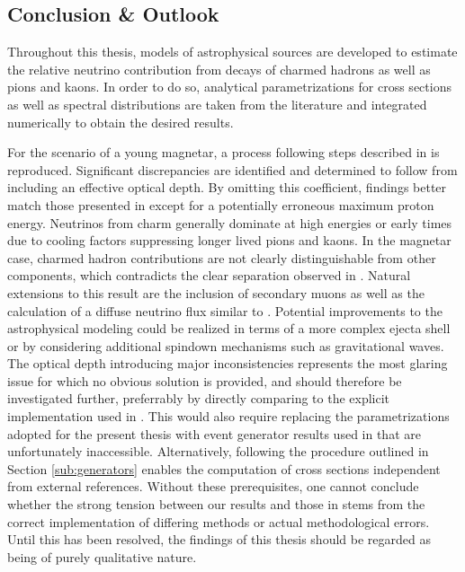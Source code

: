 \begin{spacing}{0.990}
	\chapter{Conclusion \& Outlook}
	\label{ch:conclusion}
	
	Throughout this thesis, models of astrophysical sources are developed to estimate the relative neutrino contribution from
	decays of charmed hadrons as well as pions and kaons. In order to do so, analytical parametrizations for cross sections as well as
	spectral distributions are taken from the literature and integrated numerically to obtain the desired results.
	
	For the scenario of a young magnetar, a process following steps described in \cite{Carpio_2020} is reproduced. Significant
	discrepancies are identified and determined to follow from including an effective optical depth. By omitting this coefficient,
	findings better match those presented in \cite{Carpio_2020} except for a potentially erroneous maximum proton energy. Neutrinos
	from charm generally dominate at high energies or early times due to cooling factors suppressing longer lived pions and kaons.
	In the magnetar case, charmed hadron contributions are not clearly distinguishable from other components, which contradicts
	the clear separation observed in \cite{Carpio_2020}. Natural extensions to this result are the inclusion of secondary muons as
	well as the calculation of a diffuse neutrino flux similar to \cite{Carpio_2020}. Potential improvements to the astrophysical modeling
	could be realized in terms of a more complex ejecta shell or by considering additional spindown mechanisms such as gravitational
	waves. The optical depth introducing major inconsistencies represents the most glaring issue for which no obvious solution is
	provided, and should therefore be investigated further, preferrably by directly comparing to the explicit implementation used in
	\cite{Carpio_2020}. This would also require replacing the parametrizations adopted for the present thesis with event
	generator results used in \cite{Carpio_2020} that are unfortunately inaccessible. Alternatively, following the procedure
	outlined in Section \ref{sub:generators} enables the computation of cross sections independent from external references.
	Without these prerequisites, one cannot conclude whether the strong tension between our results and those in \cite{Carpio_2020}
	stems from the correct implementation of differing methods or actual methodological errors. Until this has been resolved, the
	findings of this thesis should be regarded as being of purely qualitative nature.
	

\end{spacing}
